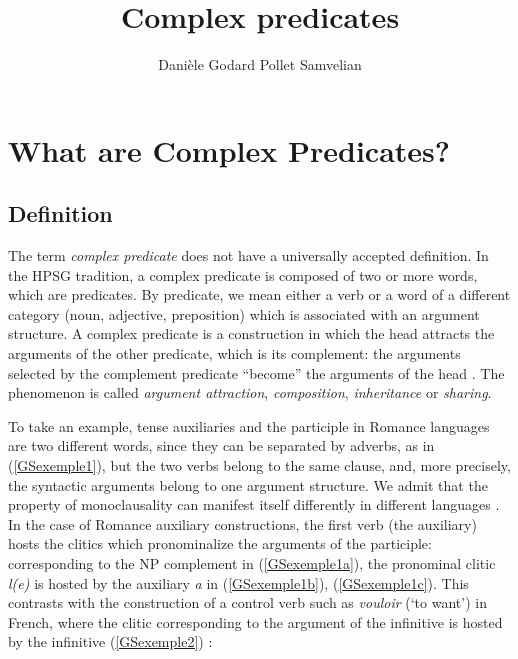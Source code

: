 \documentclass[output=paper
	        ,collection
	        ,collectionchapter
 	        ,biblatex
                ,babelshorthands
                ,newtxmath
                ,draftmode
                ,colorlinks, citecolor=brown
]{langscibook}
\author{%
	Danièle Godard\affiliation{Université Paris Diderot}%
	\lastand Pollet Samvelian\affiliation{Université Sorbonne Nouvelle}
}
\title{Complex predicates}
\begin{document}
\maketitle
\label{chap-complex-predicates}


{

\section{What are Complex Predicates?}

\subsection{Definition}\label{GSsection1.1}


The term \emph{complex predicate} does not have a universally accepted definition. In the HPSG tradition, a complex predicate is composed of two or more words, which are predicates. By predicate, we mean either a verb or a word of a different category (noun, adjective, preposition) which is associated with an argument structure. A complex predicate is a construction in which the head attracts the arguments of the other predicate, which is its complement: the arguments selected by the complement predicate ``become'' the arguments of the head \citep{HN89b, HN98a}. The phenomenon is called \emph{argument attraction}, \emph{composition}, \emph{inheritance} or \emph{sharing}.

To take an example, tense auxiliaries and the participle in Romance languages are two different words, since they can be separated by adverbs, as in (\ref{GSexemple1}), but the two verbs belong to the same clause, and, more precisely, the syntactic arguments belong to one argument structure. We admit that the property of monoclausality can manifest itself differently in different languages \citep{Butt2010a}. In the case of Romance auxiliary constructions, the first verb (the auxiliary) hosts the clitics which pronominalize the arguments of the participle: corresponding to the NP complement in (\ref{GSexemple1a}), the pronominal clitic \emph{l(e)} is hosted by the auxiliary \emph{a} in (\ref{GSexemple1b}), (\ref{GSexemple1c}). This contrasts with the construction of a control verb such as \emph{vouloir} (`to want') in French, where the clitic corresponding to the argument of the infinitive is hosted by the infinitive (\ref{GSexemple2}) \citep[from][406]{AG2002b-u}: 

\eal 
	\label{GSexemple1} 
	\label{GSexemple1a} 
		
}
\end{document}
